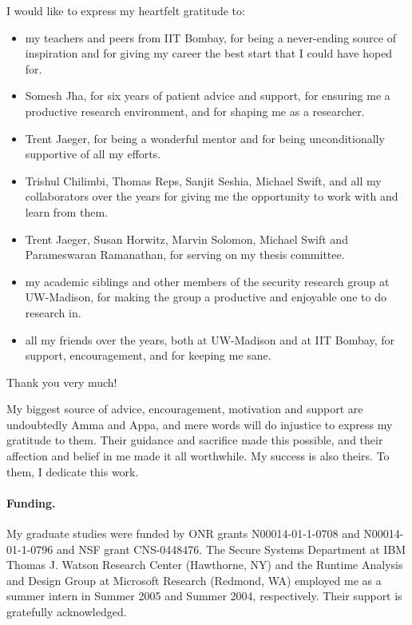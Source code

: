 \begin{acknowledgments}

I would like to express my heartfelt gratitude to:

\begin{itemize}

\item
my teachers and peers from IIT Bombay, for being a never-ending 
source of inspiration and for giving my career the best start 
that I could have hoped for.

\item
Somesh Jha, for six years of patient advice and support, for
ensuring me a productive research environment, and for shaping 
me as a researcher.

\item
Trent Jaeger, for being a wonderful mentor and for being
unconditionally supportive of all my efforts.

\item
Trishul Chilimbi, Thomas Reps, Sanjit Seshia, Michael Swift, 
and all my collaborators over the years for giving me the 
opportunity to work with and learn from them.

\item
Trent Jaeger, Susan Horwitz, Marvin Solomon, Michael Swift and
Parameswaran Ramanathan, for serving on my thesis committee.

\item
my academic siblings and other members of the security research group 
at UW-Madison, for making the group a productive and enjoyable one to 
do research in.

\item
all my friends over the years, both at UW-Madison and at IIT Bombay, 
for support, encouragement, and for keeping me sane.

\end{itemize}

Thank you very much! 

My biggest source of advice, encouragement, motivation and support 
are undoubtedly Amma and Appa, and mere words will do injustice to 
express my gratitude to them. Their guidance and sacrifice made this
possible, and their affection and belief in me made it all worthwhile.
My success is also theirs. To them, I dedicate this work.

\paragraph{Funding.} My graduate studies were funded by ONR grants 
N00014-01-1-0708 and N00014-01-1-0796 and NSF grant CNS-0448476. 
The Secure Systems Department at IBM Thomas J. Watson Research Center 
(Hawthorne, NY) and the Runtime Analysis and Design Group at Microsoft 
Research (Redmond, WA) employed me as a summer intern in Summer 2005 
and Summer 2004, respectively. Their support is gratefully acknowledged.

\end{acknowledgments}
